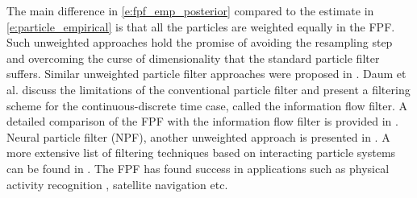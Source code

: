 The main difference in \eqref{e:fpf_emp_posterior} compared to the estimate in \eqref{e:particle_empirical} is that all the particles are weighted equally in the FPF. Such unweighted approaches hold the promise of avoiding the resampling step and overcoming the curse of dimensionality that the standard particle filter suffers. Similar unweighted particle filter approaches were proposed in \cite{mitnew04,crixio05}. Daum et al. discuss the limitations of the conventional particle filter and present a filtering scheme for the continuous-discrete time case, called the information flow filter. A detailed comparison of the FPF with the information flow filter is provided in \cite{taoyang_acc14}. Neural particle filter (NPF), another unweighted approach is presented in \cite{kutsursprpfi17}. A more extensive list of filtering techniques based on interacting particle systems can be found in \cite{yanlaumehmey16}. The FPF has found success in applications such as physical activity recognition \cite{tilhsimeh12, tilmehmey12a},  satellite navigation \cite{bergro16, berntorp15} etc. 

